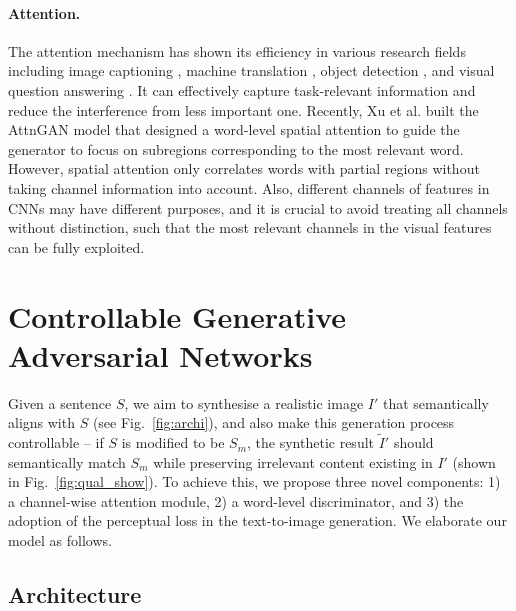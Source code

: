 \paragraph{Attention.} The attention mechanism has shown its efficiency in various research fields including image captioning \cite{xu2015show, zhang2017mdnet}, machine translation \cite{bahdanau2014neural}, object detection \cite{oliva2003top, zhang2018progressive}, and visual question answering \cite{yang2016stacked}. It can effectively capture task-relevant information and reduce the interference from less important one. Recently, Xu et al. \cite{xu2018attngan} built the AttnGAN model that designed a word-level spatial attention to guide the generator to focus on subregions corresponding to the most relevant word. {However, spatial attention only correlates words with partial regions without taking channel information into account. Also, different channels of features in CNNs may have different purposes, and it is crucial to avoid treating all channels without distinction, such that the most relevant channels in the visual features can be fully exploited. }

\section{Controllable Generative Adversarial Networks}
\label{controlGAN}

Given a sentence $S$, we aim to synthesise a realistic image ${I}'$ that semantically aligns with $S$ (see Fig.~\ref{fig:archi}), and also make this generation process controllable -- if $S$ is modified to be $S_m$, the synthetic result ${\tilde{I}}'$ should semantically match $S_m$ while preserving irrelevant content existing in ${I}'$ (shown in Fig.~\ref{fig:qual_show}). To achieve this, we propose three novel components: 1) a channel-wise attention module, 2) a word-level discriminator, and 3) the adoption of the perceptual loss in the text-to-image generation. We elaborate our model as follows.  

\subsection{Architecture}


